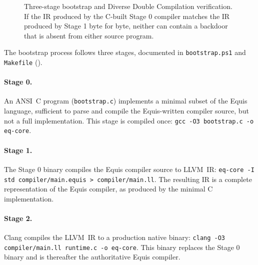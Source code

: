 \documentclass[11pt,a4paper]{article}
\theoremstyle{remark}
\begin{document}
\begin{figure}[ht]
{
}
\caption{Three-stage bootstrap and Diverse Double Compilation
verification. If the IR produced by the C-built Stage 0 compiler
matches the IR produced by Stage 1 byte for byte, neither can contain a
backdoor that is absent from either source program.}
\label{fig:bootstrap}
\end{figure}

The bootstrap process follows three stages, documented in
\texttt{bootstrap.ps1} and \texttt{Makefile} ().

\paragraph{Stage 0.} An ANSI~C program (\texttt{bootstrap.c}) implements
a minimal subset of the Equis language, sufficient to parse and compile
the Equis-written compiler source, but not a full implementation. This
stage is compiled once: \texttt{gcc -O3 bootstrap.c -o eq-core}.

\paragraph{Stage 1.} The Stage 0 binary compiles the Equis compiler
source to LLVM~IR:
\texttt{eq-core -I std compiler/main.equis > compiler/main.ll}. The
resulting IR is a complete representation of the Equis compiler, as
produced by the minimal C implementation.

\paragraph{Stage 2.} Clang compiles the LLVM~IR to a production native
binary: \texttt{clang -O3 compiler/main.ll runtime.c -o eq-core}. This
binary replaces the Stage 0 binary and is thereafter the authoritative
Equis compiler.
\end{document}
